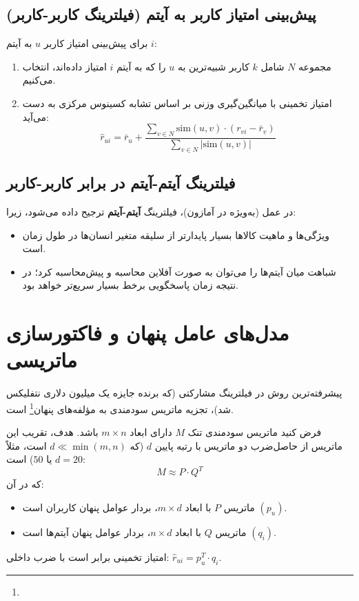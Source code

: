 \subsection{پیش‌بینی امتیاز کاربر به آیتم (فیلترینگ کاربر-کاربر)}
برای پیش‌بینی امتیاز کاربر $u$ به آیتم $i$:
\begin{enumerate}
    \item مجموعه $N$ شامل $k$ کاربر شبیه‌ترین به $u$ را که به آیتم $i$ امتیاز داده‌اند، انتخاب می‌کنیم.
    \item امتیاز تخمینی با میانگین‌گیری وزنی بر اساس تشابه کسینوس مرکزی به دست می‌آید:
    \begin{equation}
    \hat{r}_{ui} = \bar{r}_u + \frac{\sum_{v \in N} \text{sim}(u, v) \cdot (r_{vi} - \bar{r}_v)}{\sum_{v \in N} |\text{sim}(u, v)|}
    \end{equation}
\end{enumerate}

\subsection{فیلترینگ آیتم-آیتم در برابر کاربر-کاربر}
در عمل (به‌ویژه در آمازون)، فیلترینگ \textbf{آیتم-آیتم} ترجیح داده می‌شود، زیرا:
\begin{itemize}
    \item ویژگی‌ها و ماهیت کالاها بسیار پایدارتر از سلیقه متغیر انسان‌ها در طول زمان است.
    \item شباهت میان آیتم‌ها را می‌توان به صورت آفلاین محاسبه و پیش‌محاسبه کرد؛ در نتیجه زمان پاسخگویی برخط بسیار سریع‌تر خواهد بود.
\end{itemize}

\section{مدل‌های عامل پنهان و فاکتورسازی ماتریسی \texorpdfstring{}{(Matrix Factorization)}}
پیشرفته‌ترین روش در فیلترینگ مشارکتی (که برنده جایزه یک میلیون دلاری نتفلیکس شد)، تجزیه ماتریس سودمندی به مؤلفه‌های پنهان\footnote{} است.

\begin{definition}[تجزیه UV]
فرض کنید ماتریس سودمندی تنک $M$ دارای ابعاد $m \times n$ باشد. هدف، تقریب این ماتریس از حاصل‌ضرب دو ماتریس با رتبه پایین $d$ (که $d \ll \min(m, n)$ است، مثلاً $d = 20$ یا $50$) است:
\begin{equation}
M \approx P \cdot Q^T
\end{equation}
که در آن:
\begin{itemize}
    \item ماتریس $P$ با ابعاد $m \times d$، بردار عوامل پنهان کاربران است $(p_u)$.
    \item ماتریس $Q$ با ابعاد $n \times d$، بردار عوامل پنهان آیتم‌ها است $(q_i)$.
\end{itemize}
امتیاز تخمینی برابر است با ضرب داخلی: $\hat{r}_{ui} = p_u^T \cdot q_i$.
\end{definition}

